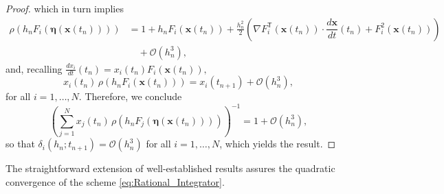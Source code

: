 \documentclass[11pt,letterpaper]{article}
\theoremstyle{remark}
\begin{document}
\begin{proof}
    which in turn implies
    \begin{equation*}
        \begin{split}
            \rho \left( h_n F_i(\bm{\eta}(\bm{x}(t_n))) \right) &= 1 + h_n F_i(\bm{x}(t_n)) + \frac{h_n^2}{2} \left( \nabla F_i^\mathsf{T}(\bm{x}(t_n)) \cdot \dfrac{d \bm{x}}{d t}(t_n) + F_i^2(\bm{x}(t_n)) \right) \\
            & \quad + \mathcal{O}(h_n^3),
        \end{split}
    \end{equation*}
    and, recalling $\frac{dx_i}{dt}(t_n)=x_i(t_n)F_i(\bm{x}(t_n)),$
    \begin{equation}\label{eq_tmp_1}
        x_i(t_n) \, \rho\left( h_n F_i(\bm{x}(t_n)) \right) = x_i(t_{n+1}) + \mathcal{O}(h_n^3),
    \end{equation}
    for all \( i = 1, \dots, N \). Therefore, we conclude
    \begin{equation}\label{eq:Normal_ordine_3}
        \left( \sum_{j=1}^N x_j(t_n) \, \rho\left( h_n F_j(\bm{\eta}(\bm{x}(t_n))) \right) \right)^{-1} = 1 + \mathcal{O}(h_n^3),
    \end{equation}
    so that \( \delta_i(h_n; t_{n+1}) = \mathcal{O}(h_n^3) \) for all \( i = 1, \dots, N \), which yields the result.
\end{proof}

The straightforward extension of well-established results assures the quadratic convergence of the scheme \eqref{eq:Rational_Integrator}.
\end{document}
